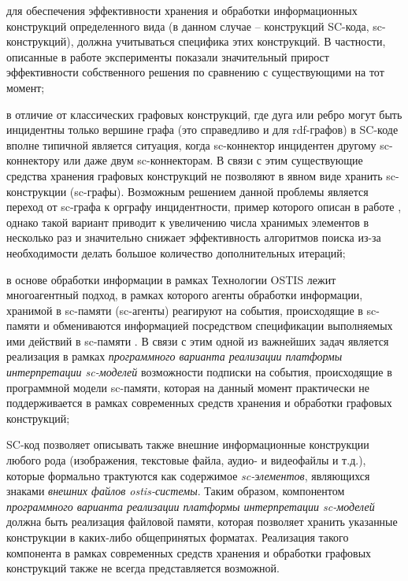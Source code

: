 \begin{SCn}
{	\begin{scnitemize}
		\item для обеспечения эффективности хранения и обработки информационных конструкций определенного вида (в данном случае -- конструкций SC-кода, sc-конструкций), должна учитываться специфика этих конструкций. В частности, описанные в работе  эксперименты показали значительный прирост эффективности собственного решения по сравнению с существующими на тот момент;
		\item в отличие от классических графовых конструкций, где дуга или ребро могут быть инцидентны только вершине графа (это справедливо и для rdf-графов) в SC-коде вполне типичной является ситуация, когда sc-коннектор инцидентен другому sc-коннектору или даже двум sc-коннекторам. В связи с этим существующие средства хранения графовых конструкций не позволяют в явном виде хранить sc-конструкции (sc-графы). Возможным решением данной проблемы является переход от sc-графа к орграфу инцидентности, пример которого описан в работе , однако такой вариант приводит к увеличению числа хранимых элементов в несколько раз и значительно снижает эффективность алгоритмов поиска из-за необходимости делать большое количество дополнительных итераций;
		\item в основе обработки информации в рамках Технологии OSTIS лежит многоагентный подход, в рамках которого агенты обработки информации, хранимой в sc-памяти (sc-агенты) реагируют на события, происходящие в sc-памяти и обмениваются информацией посредством спецификации выполняемых ими действий в sc-памяти . В связи с этим одной из важнейших задач является реализация в рамках \textit{программного варианта реализации платформы интерпретации sc-моделей} возможности подписки на события, происходящие в программной модели sc-памяти, которая на данный момент практически не поддерживается в рамках современных средств хранения и обработки графовых конструкций;
		\item SC-код позволяет описывать также внешние информационные конструкции любого рода (изображения, текстовые файла, аудио- и видеофайлы и т.д.), которые формально трактуются как содержимое \textit{sc-элементов}, являющихся знаками \textit{внешних файлов ostis-системы}. Таким образом, компонентом \textit{программного варианта реализации платформы интерпретации sc-моделей} должна быть реализация файловой памяти, которая позволяет хранить указанные конструкции в каких-либо общепринятых форматах. Реализация такого компонента в рамках современных средств хранения и обработки графовых конструкций также не всегда представляется возможной.
	\end{scnitemize}
	
}
\end{SCn}
